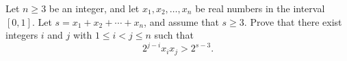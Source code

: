 Let $n \geq 3$ be an integer, and let $x_1, x_2, \ldots, x_n$ be real numbers in the interval $[0,1]$. Let $s = x_1 + x_2 + \cdots + x_n$, and assume that $s \geq 3$. Prove that there exist integers $i$ and $j$ with $1 \leq i < j \leq n$ such that
\[
2^{j-i} x_i x_j > 2^{s-3}.
\]

